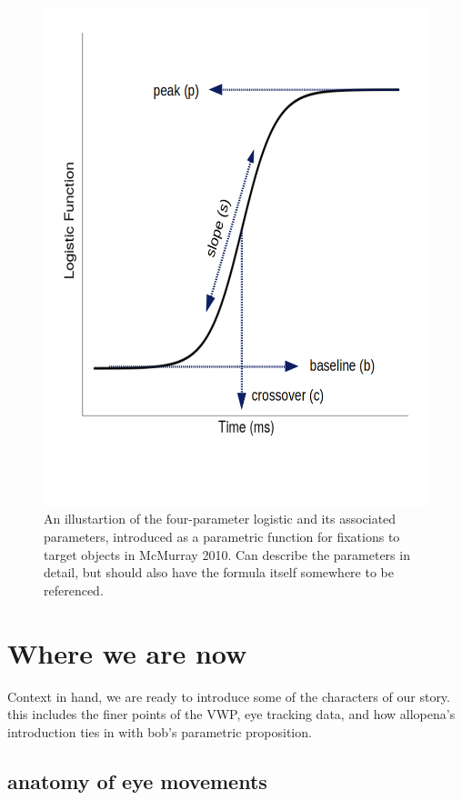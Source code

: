 \documentclass{article}
\begin{document}
\begin{figure}[h]
\centering
\includegraphics[scale=0.4]{logistic_label.png}
\caption{An illustartion of the four-parameter logistic and its associated parameters, introduced as a parametric function for fixations to target objects in McMurray 2010. Can describe the parameters in detail, but should also have the formula itself somewhere to be referenced.}
\label{fig:bob_diagram_full}
\end{figure}



\section{Where we are now}

Context in hand, we are ready to introduce some of the characters of our story. this includes the finer points of the VWP, eye tracking data, and how allopena's introduction ties in with bob's parametric proposition.

\subsection{anatomy of eye  movements}
\end{document}
